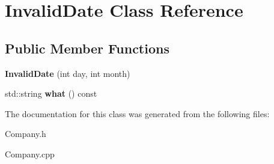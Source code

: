\hypertarget{class_invalid_date}{}\section{Invalid\+Date Class Reference}
\label{class_invalid_date}
\subsection*{Public Member Functions}
\begin{DoxyCompactItemize}
\item 
\mbox{\label{class_invalid_date_a0a8dd2b0c6857849e97680df8d99952d}} 
{\bfseries Invalid\+Date} (int day, int month)
\item 
\mbox{\label{class_invalid_date_aa27c136303d6b0b0184eb0abf3ef78e3}} 
std\+::string {\bfseries what} () const
\end{DoxyCompactItemize}


The documentation for this class was generated from the following files\+:\begin{DoxyCompactItemize}
\item 
Company.\+h\item 
Company.\+cpp\end{DoxyCompactItemize}
